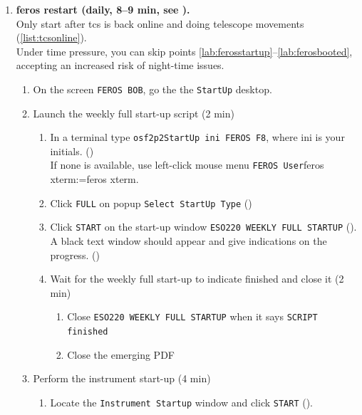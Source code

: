 \documentclass[11pt,fleqn,a4paper]{book}
\makeatletter
\def\menu#1#2{\texttt{#1}\ifx{}#2\else\@for\@x:=#2\do{$\rightarrow$\texttt{\@x}}\fi}
\def\mmenu#1#2{left-click mouse menu \menu{#1}{#2}}
\makeatother
\begin{document}
\begin{enumerate}
\begin{enumerate}
\begin{enumerate}
         \end{enumerate}
        \end{enumerate}
\newpage
  \item \textbf{\gls{feros} restart (daily, 8--9 min, see ).}\\
        Only start after \gls{tcs} is back online and doing telescope movements (\ref{list:tcsonline}).\\
        Under time pressure, you can skip points \ref{lab:ferosstartup}--\ref{lab:ferosbooted}, accepting an increased risk of night-time issues.
        \label{list:feros}
        \begin{enumerate}
         \item \label{lab:ferosstartup} On the screen \texttt{FEROS BOB},  go the the \texttt{StartUp} \gls{desktop}.
         \item Launch the weekly full start-up script (2 min)
         \begin{enumerate}
            \item In a terminal type \texttt{\gls{osf2p2StartUp} ini FEROS F8}, where ini is your initials. ()\\
               If none is available, use \mmenu{FEROS User}{feros xterm}.
            \item Click \texttt{FULL} on popup \texttt{Select StartUp Type} ()
            \item Click \texttt{START} on the start-up window \texttt{ESO220 WEEKLY FULL STARTUP} ().\\
               A black text window should appear and give indications on the progress. ()
             \item Wait for the weekly full start-up to indicate finished and close it (2 min)
                \begin{enumerate}
                   \item Close \texttt{ESO220 WEEKLY FULL STARTUP} when it says \texttt{SCRIPT finished} 
                   \item Close the emerging PDF
                \end{enumerate}
            \end{enumerate}
        \item Perform the instrument start-up (4 min) 
            \begin{enumerate}
                \item Locate the \texttt{Instrument Startup} window and click \texttt{START} ().

\end{enumerate}
\end{enumerate}
\end{enumerate}
\end{document}
